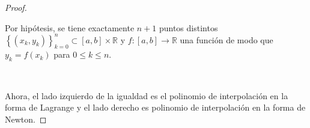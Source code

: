 \begin{frame}
\begin{proof}
		\

		Por hipótesis, se tiene exactamente $n+1$ puntos distintos
		\begin{math}
			{
				\left\{
				\left(x_{k},y_{k}\right)
				\right\}
			}_{k=0}^{n}\subset
			\left[a,b\right]\times\mathbb{R}
		\end{math}
		y
		\begin{math}
			f\colon\left[a,b\right]\to
			\mathbb{R}
		\end{math}
		una función de modo que
		\begin{math}
			y_{k}=
			f\left(x_{k}\right)
		\end{math}
		para $0\leq k\leq n$.

		\

		Ahora, el lado izquierdo de la igualdad es el polinomio de
		interpolación en la forma de \alert{Lagrange}
		y el lado derecho es polinomio de interpolación en la forma de
		\alert{Newton}.
	\end{proof}
\end{frame}

